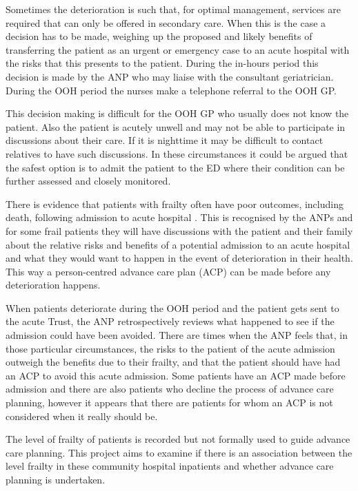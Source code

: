 \documentclass
[
	12pt,
	a4paper,
	oneside,
]{article}
\begin{document}
Sometimes the deterioration is such that, 
for optimal management, services are required that can only be offered in secondary 
care. When this is the case a decision has to be made, weighing up the proposed
and likely benefits of transferring the patient as an urgent or emergency case to
an acute hospital with the risks that this presents to the patient. During the in-hours
period this decision is made by the ANP who may liaise with the consultant geriatrician. During
the OOH period the nurses make a telephone referral to the OOH GP.

This decision making is difficult for the OOH GP who usually does not know the patient.
Also the patient is acutely unwell and may not be able to participate in discussions
about their care. If it is nighttime it may be difficult to contact relatives to 
have such discussions. In these circumstances it could
be argued that the safest option is to admit the patient to the ED where their 
condition can be further assessed and closely monitored.

There is evidence that patients with frailty often have poor outcomes, including death,
following admission to acute hospital \parencite{silver:12, wallis:15}. 
This is recognised by the ANPs and for some frail patients they 
will have discussions with the patient and their family about the relative risks
and benefits of a potential admission to an acute hospital and what they would want to 
happen in the event of deterioration in their health. This way a person-centred 
advance care plan (ACP) can be made before any deterioration happens.

When patients deteriorate during the OOH period and the patient
gets sent to the acute Trust, the ANP retrospectively reviews what happened to see if the admission
could have been avoided. There are times when the ANP feels that, in those particular
circumstances, the risks to the patient of the acute admission outweigh the benefits
due to their frailty, and that the patient should have had an ACP
to avoid this acute admission. Some patients have an ACP made before admission 
and there are also patients who decline the process of advance care planning, however it appears 
that there are patients for whom an ACP is not considered when it really should be.

The level of frailty of patients is recorded but not formally used to guide advance
care planning. This project aims to examine if there is an association between the 
level frailty in these community hospital inpatients and whether advance care planning
is undertaken.
\end{document}

